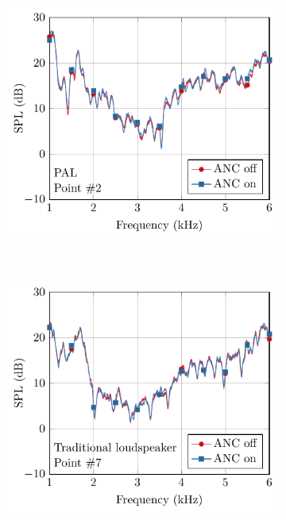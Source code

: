 \begin{figure}[!htb]
\begin{subfigure}{0.4\textwidth}
        \includegraphics[width = \textwidth]{fig/PAL_eval2_ANC_spectrum.pdf}
        \caption{}
    \end{subfigure}
    \\
    \begin{subfigure}{0.4\textwidth}
        \centering
        \includegraphics[width = \textwidth]{fig/Genelc_eval7_ANC_spectrum.pdf}
        \caption{}
    \end{subfigure}

\end{figure}
